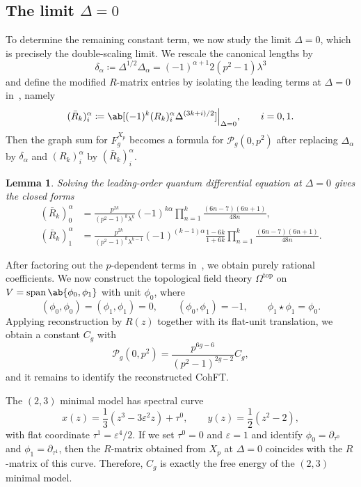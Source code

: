 \documentclass{amsart}
\newtheorem{lem}[thm]{Lemma}
\theoremstyle{definition}
\theoremstyle{remark}
\theoremstyle{plain}
\theoremstyle{definition}
\theoremstyle{remark}
\newcommand{\ep}{\varepsilon}
\newcommand{\mc}[1]{\mathcal{#1}}
\newcommand{\mr}[1]{\mathrm{#1}}
\newcommand{\on}[1]{\operatorname{#1}}
\newcommand{\1}{\mathbf{1}}
\newcommand{\2}{\mathbf{2}}
\newcommand{\3}{\mathbf{3}}
\begin{document}
\subsection{The limit \(\Delta = 0\)}%
\label{sub:The limit Delta = 0}

To determine the remaining constant term, we now study the limit \(\Delta = 0\), which is precisely the double-scaling limit. We rescale the canonical lengths by
\[ \delta_{\alpha} \coloneqq \Delta^{1/2}\Delta_{\alpha} = (-1)^{\alpha+1}2(p^2-1)\lambda^3 \]
and define the modified \(R\)-matrix entries by isolating the leading terms at \(\Delta = 0\) in~, namely
\[ (\bar{R}_k)_i^{\alpha} \coloneqq \ab[(-1)^k (R_k)_i^{\alpha}\Delta^{(3k+i)/2}]\Big|_{\Delta=0}, \qquad i = 0,1. \]
Then the graph sum for \(F_g^{X_p}\) becomes a formula for \(\mc{P}_g(0,p^2)\) after replacing \(\Delta_{\alpha}\) by \(\delta_{\alpha}\) and \((R_k)_i^{\alpha}\) by \((\bar{R}_k)_i^{\alpha}\).

\begin{lem}%
\label{lem:R matrix at Delta zero}
    Solving the leading-order quantum differential equation at \(\Delta = 0\) gives the closed forms
    \begin{align*}
        (\bar{R}_k)_0^{\alpha} &= \frac{p^{2k}}{(p^2-1)^k\lambda^k}(-1)^{k\alpha}\prod_{n=1}^k \frac{(6n-7)(6n+1)}{48n}, \\
        (\bar{R}_k)_1^{\alpha} &= \frac{p^{2k}}{(p^2-1)^k \lambda^{k-1}}(-1)^{(k-1)\alpha}\frac{1-6k}{1+6k}\prod_{n=1}^k \frac{(6n-7)(6n+1)}{48n}.
    \end{align*}
\end{lem}

After factoring out the \(p\)-dependent terms in~, we obtain purely rational coefficients. We now construct the topological field theory \(\Omega^{\mr{top}}\) on \(V = \on{span}\ab\{\phi_0,\phi_1\}\) with unit \(\phi_0\), where
\[ (\phi_0,\phi_0) = (\phi_1,\phi_1) = 0, \qquad (\phi_0,\phi_1) = -1, \qquad \phi_1 \star \phi_1 = \phi_0. \]
Applying reconstruction by \(R(z)\) together with its flat-unit translation, we obtain a constant \(C_g\) with
\[ \mc{P}_g(0,p^2) = \frac{p^{6g-6}}{(p^2-1)^{2g-2}}C_g, \]
and it remains to identify the reconstructed CohFT.

The \((2,3)\) minimal model has spectral curve
\[ x(z) = \frac{1}{3}(z^3-3\ep^2 z) + \tau^0, \qquad y(z) = \frac{1}{2}(z^2-2), \]
with flat coordinate \(\tau^1 = \ep^4/2\). If we set \(\tau^0 = 0\) and \(\ep = 1\) and identify \(\phi_0 = \partial_{\tau^0}\) and \(\phi_1 = \partial_{\tau^1}\), then the \(R\)-matrix obtained from \(X_p\) at \(\Delta = 0\) coincides with the \(R\)-matrix of this curve. Therefore, \(C_g\) is exactly the free energy of the \((2,3)\) minimal model.
\end{document}
